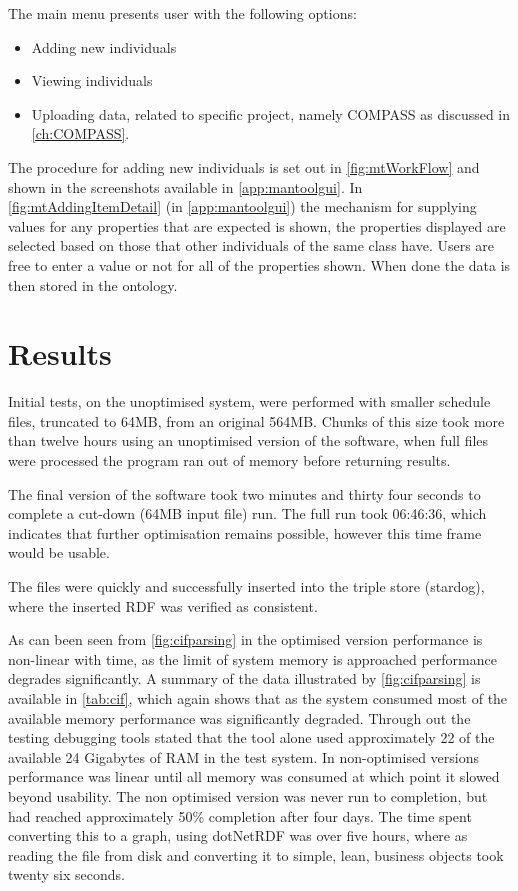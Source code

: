 The main menu presents user with the following options:
\begin{itemize}
    \item Adding new individuals
    \item Viewing individuals
    \item Uploading data, related to specific project, namely COMPASS as discussed in \autoref{ch:COMPASS}. 
\end{itemize}

The procedure for adding new individuals is set out in \autoref{fig:mtWorkFlow} and shown in the screenshots available in \autoref{app:mantoolgui}. In \autoref{fig:mtAddingItemDetail} (in  \autoref{app:mantoolgui}) the mechanism for supplying values for any properties that are expected is shown, the properties displayed are selected based on those that other individuals of the same class have. Users are free to enter a value or not for all of the properties shown. When done the data is then stored in the ontology.

\section{Results} 
Initial tests, on the unoptimised system, were performed with smaller schedule files, truncated to 64MB, from an original 564MB. Chunks of this size took more than twelve hours using an unoptimised version of the software, when full files were processed the program ran out of memory before returning results.

The final version of the software took two minutes and thirty four seconds to complete a cut-down (64MB input file) run. The full run took 06:46:36, which indicates that further optimisation remains possible, however this time frame would be usable.  

The files were quickly and successfully inserted into the triple store (stardog), where the inserted RDF was verified as consistent. 

As can been seen from \autoref{fig:cifparsing} in the optimised version performance is non-linear with time, as the limit of system memory is approached performance degrades significantly. A summary of the data illustrated by \autoref{fig:cifparsing} is available in \autoref{tab:cif}, which again shows that as the system consumed most of the available memory performance was significantly degraded. Through out the testing debugging tools stated that the tool alone used approximately 22 of the available 24 Gigabytes of RAM in the test system. In non-optimised versions performance was linear until all memory was consumed at which point it slowed beyond usability. The non optimised version was never run to completion, but had reached approximately 50\% completion after four days. The time spent converting this to a graph, using dotNetRDF was over five hours, where as reading the file from disk and converting it to simple, lean, business objects took twenty six seconds. 

